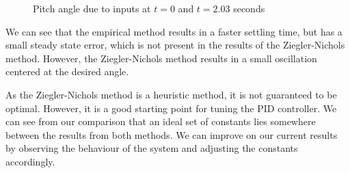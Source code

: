 \documentclass[12pt]{article}
\begin{document}
\begin{figure}
    \centering
    \caption{Pitch angle due to inputs at $t = 0$ and $t = 2.03$ seconds}
    \label{fig:tuning-comparison}
\end{figure}

We can see that the empirical method results in a faster settling time, but has a small steady state error, which is not present in the results of the Ziegler-Nichols method. However, the Ziegler-Nichols method results in a small oscillation centered at the desired angle. 

As the Ziegler-Nichols method is a heuristic method, it is not guaranteed to be optimal. However, it is a good starting point for tuning the PID controller. We can see from our comparison that an ideal set of constants lies somewhere between the results from both methods. We can improve on our current results by observing the behaviour of the system and adjusting the constants accordingly.
\end{document}
